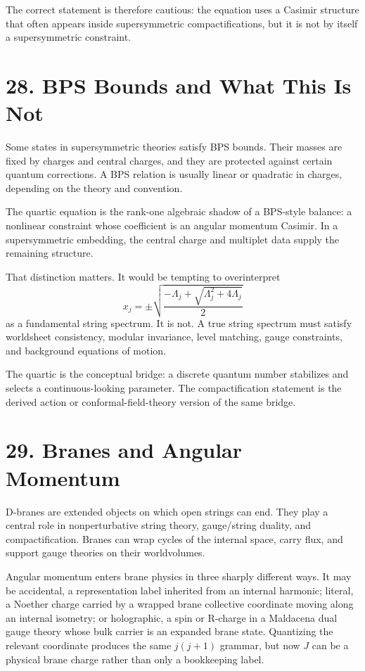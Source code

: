 \documentclass[11pt]{article}
\newcommand{\Lspin}{\Lambda_j}
\begin{document}
The correct statement is therefore cautious: the equation uses a Casimir structure that often appears inside supersymmetric compactifications, but it is not by itself a supersymmetric constraint.


\section*{28. BPS Bounds and What This Is Not}

Some states in supersymmetric theories satisfy BPS bounds. Their masses are fixed by charges and central charges, and they are protected against certain quantum corrections. A BPS relation is usually linear or quadratic in charges, depending on the theory and convention.

The quartic equation is the rank-one algebraic shadow of a BPS-style balance: a nonlinear constraint whose coefficient is an angular momentum Casimir. In a supersymmetric embedding, the central charge and multiplet data supply the remaining structure.

That distinction matters. It would be tempting to overinterpret
\[
        x_j=\pm
        \sqrt{\frac{-\Lspin+\sqrt{\Lspin^2+4\Lspin}}{2}}
\]
as a fundamental string spectrum. It is not. A true string spectrum must satisfy worldsheet consistency, modular invariance, level matching, gauge constraints, and background equations of motion.

The quartic is the conceptual bridge: a discrete quantum number stabilizes and selects a continuous-looking parameter. The compactification statement is the derived action or conformal-field-theory version of the same bridge.


\section*{29. Branes and Angular Momentum}

D-branes are extended objects on which open strings can end. They play a central role in nonperturbative string theory, gauge/string duality, and compactification. Branes can wrap cycles of the internal space, carry flux, and support gauge theories on their worldvolumes.

Angular momentum enters brane physics in three sharply different ways. It may be accidental, a representation label inherited from an internal harmonic; literal, a Noether charge carried by a wrapped brane collective coordinate moving along an internal isometry; or holographic, a spin or R-charge in a Maldacena dual gauge theory whose bulk carrier is an expanded brane state. Quantizing the relevant coordinate produces the same \(j(j+1)\) grammar, but now \(J\) can be a physical brane charge rather than only a bookkeeping label.
\end{document}
